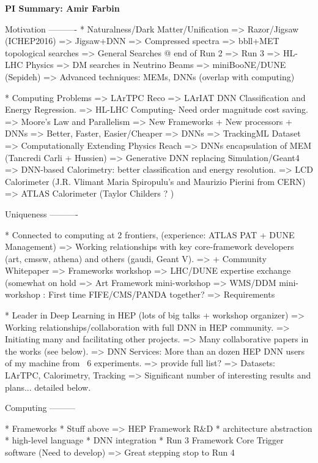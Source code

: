 
\begin{center}
\Large\textbf{PI Summary: Amir Farbin}
\end{center}

Motivation
----------
* Naturalness/Dark Matter/Unification 
   => Razor/Jigsaw (ICHEP2016) => Jigsaw+DNN
      => Compressed spectra  
      => bbll+MET topological searches 
      => General Searches @ end of Run 2 => Run 3 
      => HL-LHC Physics
   => DM searches in Neutrino Beams
      => miniBooNE/DUNE (Sepideh)
   => Advanced techniques: MEMs, DNNs (overlap with computing)

* Computing Problems
   => LArTPC Reco 
      => LArIAT DNN Classification and Energy Regression.
   => HL-LHC Computing- Need order magnitude cost saving.
      => Moore's Law and Parallelism => New Frameworks + New processors + DNNs
      => Better, Faster, Easier/Cheaper => DNNs
      => TrackingML Dataset
   => Computationally Extending Physics Reach 
      => DNNs encapsulation of MEM (Tancredi Carli + Hussien)
      => Generative DNN replacing Simulation/Geant4
      => DNN-based Calorimetry: better classification and energy resolution.
         => LCD Calorimeter (J.R. Vlimant Maria Spiropulu's and Maurizio Pierini from CERN)
         => ATLAS Calorimeter (Taylor Childers ? ) 


Uniqueness
----------

* Connected to computing at 2 frontiers, (experience: ATLAS PAT + DUNE Management)
   => Working relationships with key core-framework developers (art, cmssw, athena) and others (gaudi, Geant V). 
   => + Community Whitepaper
      => Frameworks workshop
   => LHC/DUNE expertise exchange (somewhat on hold
      => Art Framework mini-workshop
      => WMS/DDM mini-workshop : First time FIFE/CMS/PANDA together? => Requirements

* Leader in Deep Learning in HEP (lots of big talks + workshop organizer)
   => Working relationships/collaboration with full DNN in HEP community.
      => Initiating many and facilitating other projects.
      => Many collaborative papers in the works (see below).
   => DNN Services: More than an dozen HEP DNN users of my machine from ~6 experiments. 
      => provide full list?
   => Datasets: LArTPC, Calorimetry, Tracking   
   => Significant number of interesting results and plans... detailed below.

Computing
---------

* Frameworks
  * Stuff above => HEP Framework R&D
     * architecture abstraction
     * high-level language
     * DNN integration
  * Run 3 Framework Core Trigger software (Need to develop)
     => Great stepping stop to Run 4

